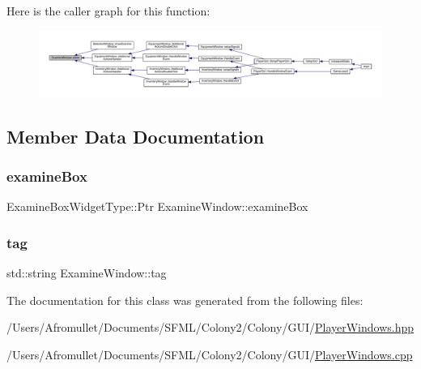 Here is the caller graph for this function\+:
\nopagebreak
\begin{figure}[H]
\begin{center}
\leavevmode
\includegraphics[width=350pt]{d0/d28/class_examine_window_a5d93b356de906a2b4891b8ff79425b90_icgraph}
\end{center}
\end{figure}


\subsection{Member Data Documentation}
\mbox{\label{class_examine_window_ac2d48b2c4457c6e998eac5dafd2c3358}} 
\subsubsection{\texorpdfstring{examine\+Box}{examineBox}}
{\footnotesize\ttfamily Examine\+Box\+Widget\+Type\+::\+Ptr Examine\+Window\+::examine\+Box\hspace{0.3cm}{\ttfamily [private]}}

\mbox{\label{class_examine_window_a37c9aa9a35067245eb8ed5f0f39f3e0b}} 
\subsubsection{\texorpdfstring{tag}{tag}}
{\footnotesize\ttfamily std\+::string Examine\+Window\+::tag\hspace{0.3cm}{\ttfamily [private]}}



The documentation for this class was generated from the following files\+:\begin{DoxyCompactItemize}
\item 
/\+Users/\+Afromullet/\+Documents/\+S\+F\+M\+L/\+Colony2/\+Colony/\+G\+U\+I/\mbox{\hyperlink{_player_windows_8hpp}{Player\+Windows.\+hpp}}\item 
/\+Users/\+Afromullet/\+Documents/\+S\+F\+M\+L/\+Colony2/\+Colony/\+G\+U\+I/\mbox{\hyperlink{_player_windows_8cpp}{Player\+Windows.\+cpp}}\end{DoxyCompactItemize}

